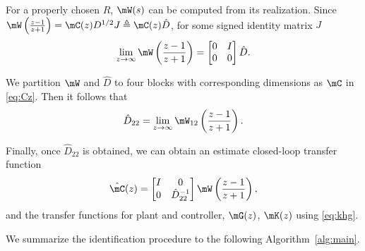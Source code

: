   For a properly chosen $R$, $\mW(s)$ can be computed from its realization. Since $\mW\left(\frac{z-1}{z+1}\right)=\mC(z)D^{1/2}J\triangleq \mC(z)\hat{D}$, for some signed identity matrix $J$ \cite{hayden}
  \begin{equation}
    \lim_{z\rightarrow\infty}\mW\left(\frac{z-1}{z+1}\right)=\begin{bmatrix} 0 & I \\
      0 & 0 
    \end{bmatrix} \hat{D}.
  \end{equation}

  We partition $\mW$ and $\hat{D}$ to four blocks with corresponding dimensions as $\mC$ in \eqref{eq:Cz}. Then it follows that 
  \begin{equation}\label{eq:D22}
    \hat{D}_{22}=\lim_{z\rightarrow\infty}\mW_{12}\left(\frac{z-1}{z+1}\right).
  \end{equation}

  Finally, once $\hat{D}_{22}$ is obtained, we can obtain an estimate closed-loop transfer function
  \begin{align}\label{eq:estC}
  \hat{\mC}(z) = \begin{bmatrix} 
    I & 0 \\ 
    0 & \hat{D}_{22}^{-1}
    \end{bmatrix} \mW \left(\frac{z-1}{z+1}\right),
  \end{align}
  and the transfer functions for plant and controller, $\mG(z)$, $\mK(z)$ using \eqref{eq:khg}.

  We summarize the identification procedure to the following Algorithm~\ref{alg:main}. 

